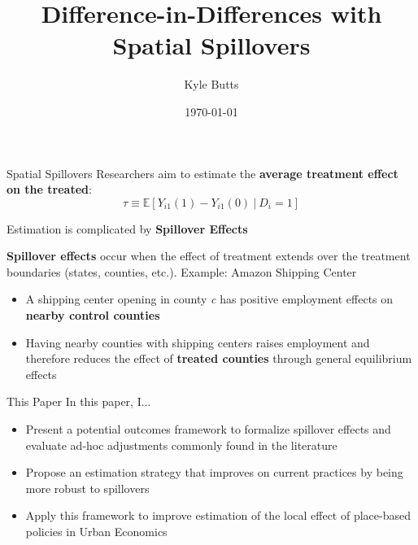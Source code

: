 \documentclass[aspectratio=169]{beamer}
\title{Difference-in-Differences with Spatial Spillovers}
\date{\today}
\author{Kyle Butts}
\begin{document}
\maketitle

\begin{frame}{Spatial Spillovers}
    Researchers aim to estimate the \textbf{average treatment effect on the treated}: 
    \[
        \tau \equiv \mathbb{E} \left[ Y_{i1}(1) - Y_{i1}(0) \ \vert \ D_{i} = 1 \right]
    \]
    
    Estimation is complicated by \textbf{Spillover Effects}
    
    \vspace{5mm}
    \textbf{Spillover effects} occur when the effect of treatment extends over the treatment boundaries (states, counties, etc.). Example: Amazon Shipping Center
    
    \begin{itemize}
        \item A shipping center opening in county \textit{c} has positive employment effects on \textbf{nearby control counties}
        
        \item Having nearby counties with shipping centers raises employment and therefore reduces the effect of \textbf{treated counties} through general equilibrium effects
    \end{itemize}
\end{frame}

\begin{frame}{This Paper}
    In this paper, I...

    \begin{itemize}
        \item Present a potential outcomes framework to formalize spillover effects and evaluate ad-hoc adjustments commonly found in the literature
        
        \item Propose an estimation strategy that improves on current practices by being more robust to spillovers
        
        \item Apply this framework to improve estimation of the local effect of place-based policies in Urban Economics 
    \end{itemize}

\end{frame}
\end{document}
